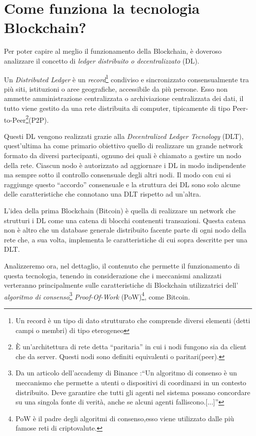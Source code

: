 \section{Come funziona la tecnologia Blockchain?} \label{1.2}
Per poter capire al meglio il funzionamento della Blockchain, è doveroso analizzare il concetto di \textit{ledger distribuito o decentralizzato} (DL).

Un \textit{Distributed Ledger} è un \textit{record}\footnote{Un record è un tipo di dato strutturato che comprende diversi elementi (detti campi o membri) di tipo eterogeneo} condiviso e sincronizzato consensualmente tra più siti, istituzioni o aree geografiche, accessibile da più persone. Esso non ammette amministrazione centralizzata o archiviazione centralizzata dei dati, il tutto viene gestito da una rete distribuita di computer, tipicamente di tipo Peer-to-Peer\footnote{ È un'architettura di rete detta “paritaria” in cui i nodi fungono sia da client che da server. Questi nodi sono definiti equivalenti o paritari(peer).}(P2P).

Questi DL vengono realizzati grazie alla \textit{Decentralized Ledger Tecnology} (DLT), quest'ultima ha come primario obiettivo quello di realizzare un grande network formato da diversi partecipanti, ognuno  dei quali è chiamato a gestire un nodo della rete. Ciascun nodo è autorizzato ad aggiornare i DL in modo indipendente ma sempre sotto il controllo consensuale degli altri nodi. Il modo con cui si raggiunge questo “accordo” consensuale e la struttura dei DL sono solo alcune delle caratteristiche che connotano una DLT rispetto ad un'altra.

L'idea della prima Blockchain (Bitcoin) è quella di realizzare un network che strutturi i DL come una catena di blocchi contenenti transazioni. Questa catena non è altro che un database generale distribuito facente parte di ogni nodo della rete che, a sua volta, implementa le caratteristiche di cui sopra descritte per una DLT.

Analizzeremo ora, nel dettaglio, il contenuto che permette il funzionamento di questa tecnologia, tenendo in considerazione che i meccanismi analizzati verteranno principalmente sulle caratteristiche di Blockchain utilizzatrici dell' \textit{algoritmo di consenso}\footnote{Da un articolo dell'accademy di Binance \cite{algoritmo_consenso}:“Un algoritmo di consenso è un meccanismo che permette a utenti o dispositivi di coordinarsi in un contesto distribuito. Deve garantire che tutti gli agenti nel sistema possano concordare su una singola fonte di verità, anche se alcuni agenti falliscono.[...]”} \textit{Proof-Of-Work} (PoW)\footnote{PoW è il padre degli algoritmi di consenso,esso viene utilizzato dalle più famose reti di criptovalute.}, come Bitcoin.


